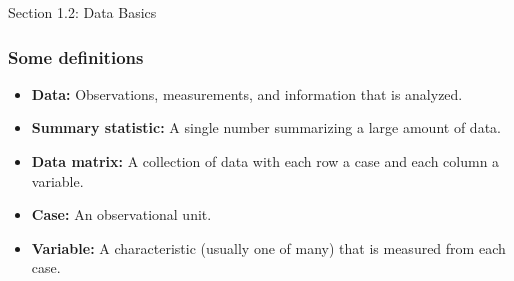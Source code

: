 
\begin{frame}
Section 1.2: Data Basics
\end{frame}



\begin{frame}
\frametitle{Some definitions}

\begin{itemize}
\item {\bf Data:} \pause Observations, measurements, and information that is analyzed. \pause
\item {\bf Summary statistic:} \pause A single number summarizing a large amount of data. \pause
\item {\bf Data matrix:} \pause A collection of data with each row a case and each column a variable. \pause
\item {\bf Case:} \pause An observational unit. \pause
\item {\bf Variable:} \pause A characteristic (usually one of many) that is measured from each case.
\end{itemize}

\end{frame}







